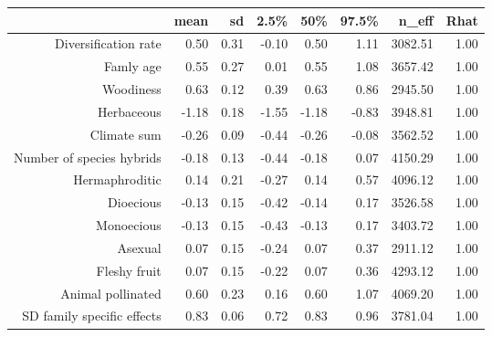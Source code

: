 \begin{table}[ht]
\centering
\begin{tabular}{rrrrrrrr}
  \hline
 & mean & sd & 2.5\% & 50\% & 97.5\% & n\_eff & Rhat \\ 
  \hline
Diversification rate & 0.50 & 0.31 & -0.10 & 0.50 & 1.11 & 3082.51 & 1.00 \\ 
  Famly age & 0.55 & 0.27 & 0.01 & 0.55 & 1.08 & 3657.42 & 1.00 \\ 
  Woodiness & 0.63 & 0.12 & 0.39 & 0.63 & 0.86 & 2945.50 & 1.00 \\ 
  Herbaceous & -1.18 & 0.18 & -1.55 & -1.18 & -0.83 & 3948.81 & 1.00 \\ 
  Climate sum & -0.26 & 0.09 & -0.44 & -0.26 & -0.08 & 3562.52 & 1.00 \\ 
  Number of species hybrids & -0.18 & 0.13 & -0.44 & -0.18 & 0.07 & 4150.29 & 1.00 \\ 
  Hermaphroditic & 0.14 & 0.21 & -0.27 & 0.14 & 0.57 & 4096.12 & 1.00 \\ 
  Dioecious & -0.13 & 0.15 & -0.42 & -0.14 & 0.17 & 3526.58 & 1.00 \\ 
  Monoecious & -0.13 & 0.15 & -0.43 & -0.13 & 0.17 & 3403.72 & 1.00 \\ 
  Asexual & 0.07 & 0.15 & -0.24 & 0.07 & 0.37 & 2911.12 & 1.00 \\ 
  Fleshy fruit & 0.07 & 0.15 & -0.22 & 0.07 & 0.36 & 4293.12 & 1.00 \\ 
  Animal pollinated & 0.60 & 0.23 & 0.16 & 0.60 & 1.07 & 4069.20 & 1.00 \\ 
  SD family specific effects & 0.83 & 0.06 & 0.72 & 0.83 & 0.96 & 3781.04 & 1.00 \\ 
   \hline
\end{tabular}
\end{table}
